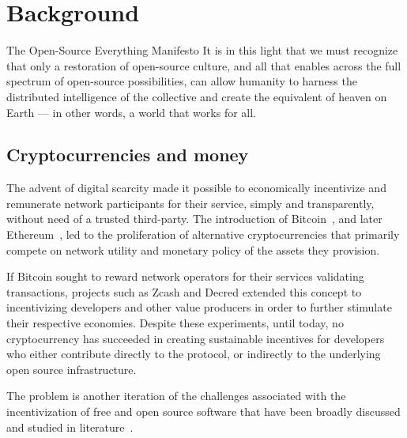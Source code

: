 \section{Background}

\begin{epigraph}{The Open-Source Everything Manifesto}
    \noindent It is in this light that we must recognize that only a restoration of
    open-source culture, and all that enables across the full spectrum of
    open-source possibilities, can allow humanity to harness the distributed
    intelligence of the collective and create the equivalent of heaven on Earth
    --- in other words, a world that works for all.
\end{epigraph}

\subsection{Cryptocurrencies and money}

The advent of digital scarcity made it possible to economically incentivize
and remunerate network participants for their service, simply and
transparently, without need of a trusted third-party. The introduction
of Bitcoin~\cite{bitcoin}, and later Ethereum~\cite{ethereum}, led to the
proliferation of alternative cryptocurrencies that primarily compete on network
utility and monetary policy of the assets they provision.


If Bitcoin sought to reward network operators for their services validating
transactions, projects such as Zcash and Decred extended this concept to
incentivizing developers and other value producers in order to further stimulate
their respective economies. Despite these experiments, until today, no cryptocurrency
has succeeded in creating sustainable incentives for developers who either
contribute directly to the protocol, or indirectly to the underlying open source
infrastructure.

The problem is another iteration of the challenges associated with the
incentivization of free and open source software that have been broadly
discussed and studied in literature~\cite{roads and bridges}.

